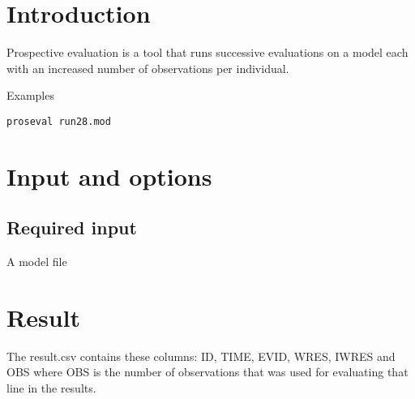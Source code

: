 

\newcommand{\guidetoolname}{proseval}



\maketitle


\section{Introduction}
Prospective evaluation is a tool that runs successive evaluations on a model each with an increased number of observations per individual.

Examples
\begin{verbatim}
proseval run28.mod
\end{verbatim}

\section{Input and options}

\subsection{Required input}
A model file



\section{Result}

The result.csv contains these columns: ID, TIME, EVID, WRES, IWRES and OBS where
OBS is the number of observations that was used for evaluating that line in the results.




